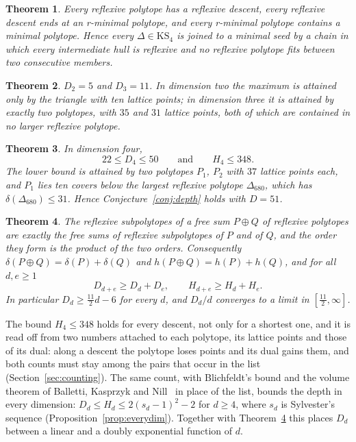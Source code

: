 \documentclass[11pt]{amsart}
\newtheorem{theorem}{Theorem}
\theoremstyle{definition}
\theoremstyle{remark}
\newcommand{\KS}{\mathrm{KS}}
\newcommand{\Dbig}{\Delta_{680}}
\newcommand{\UB}{348}
\newcommand{\LB}{22}
\newcommand{\DUB}{31}
\newcommand{\UBs}{50}
\begin{document}
\begin{theorem}\label{thm:A}
Every reflexive polytope has a reflexive descent, every reflexive descent
ends at an r-minimal polytope, and every r-minimal polytope contains a
minimal polytope. Hence every $\Delta\in\KS_4$ is joined to a minimal seed
by a chain in which every intermediate hull is reflexive and no reflexive
polytope fits between two consecutive members.
\end{theorem}

\begin{theorem}\label{thm:B}
$D_2=5$ and $D_3=11$. In dimension two the maximum is attained only by the
triangle with ten lattice points; in dimension three it is attained by
exactly two polytopes, with $35$ and $31$ lattice points, both of which are
contained in no larger reflexive polytope.
\end{theorem}

\begin{theorem}\label{thm:C}
In dimension four,
\[
\LB\le D_4\le\UBs\qquad\text{and}\qquad H_4\le\UB .
\]
The lower bound is attained by two polytopes $P_1$, $P_2$ with $37$
lattice points each, and $P_1$ lies ten covers below the largest reflexive
polytope $\Dbig$, which has $\delta(\Dbig)\le\DUB$. Hence
Conjecture~\ref{conj:depth} holds with $D=51$.
\end{theorem}

\begin{theorem}\label{thm:D}
The reflexive subpolytopes of a free sum $P\oplus Q$ of reflexive polytopes
are exactly the free sums of reflexive subpolytopes of $P$ and of $Q$, and
the order they form is the product of the two orders. Consequently
$\delta(P\oplus Q)=\delta(P)+\delta(Q)$ and $h(P\oplus Q)=h(P)+h(Q)$, and
for all $d,e\ge1$
\[
D_{d+e}\ge D_d+D_e,\qquad H_{d+e}\ge H_d+H_e .
\]
In particular $D_d\ge\tfrac{11}{2}d-6$ for every $d$, and
$D_d/d$ converges to a limit in $[\tfrac{11}{2},\infty]$.
\end{theorem}

The bound $H_4\le\UB$ holds for every descent, not only for a shortest
one, and it is read off from two numbers attached to each polytope, its
lattice points and those of its dual: along a descent the polytope loses
points and its dual gains them, and both counts must stay among the pairs
that occur in the list (Section~\ref{sec:counting}). The same count, with
Blichfeldt's bound and the volume theorem of Balletti, Kasprzyk and
Nill~\cite{BKN22} in place of the list, bounds the depth in every
dimension: $D_d\le H_d\le2(s_d-1)^2-2$ for $d\ge4$, where $s_d$ is
Sylvester's sequence (Proposition~\ref{prop:everydim}). Together with
Theorem~\ref{thm:D} this places $D_d$ between a linear and a doubly
exponential function of $d$.
\end{document}
